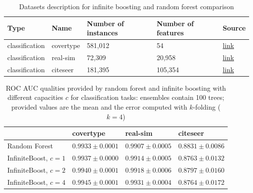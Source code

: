 \begin{table}[!t]
  \caption{Datasets description for infinite boosting and random forest comparison}
  \label{tab:rf-data}
  \centering
  \dospace
  \begin{tabular}{lllll}
    \toprule
    Type     &  Name & Number of instances     & Number of features & Source \\
    \midrule
    classification & covertype & 581,012  & 54  & \href{https://archive.ics.uci.edu/ml/datasets/covertype}{\underline{link}}   \\
    classification     & real-sim  & 72,309 & 20,958  & \href{https://www.csie.ntu.edu.tw/~cjlin/libsvmtools/datasets/binary.html}{\underline{link}}     \\
    classification     & citeseer &  181,395 & 105,354 & \href{http://komarix.org/ac/ds/}{\underline{link}}\\
    \bottomrule
  \end{tabular}
\end{table}

\begin{table}[!t]
    \caption{
    ROC AUC qualities provided by random forest and infinite boosting with different capacities $c$ for classification tasks: ensembles contain 100 trees;
    provided values are the mean and the error computed with $k$-folding ($k=4$)
    }
    \label{tab:rf-auc}
    \centering
    \dospace
    \begin{tabular}{llll}
    \toprule
    {} &               covertype &               real-sim &              citeseer \\
    \midrule
    Random Forest      &  $ 0.9933 \pm 0.0001 $ &  $ 0.9907 \pm 0.0005 $ &  $ 0.8831 \pm 0.0086 $ \\
    InfiniteBoost, $c=1$ &  $ 0.9937 \pm 0.0000 $ &  $ 0.9914 \pm 0.0005 $ &  $ 0.8763 \pm 0.0132 $ \\
    InfiniteBoost, $c=2$ &  $ 0.9940 \pm 0.0001 $ &  $ 0.9918 \pm 0.0006 $ &  $ 0.8797 \pm 0.0160 $ \\
    InfiniteBoost, $c=4$ &  $ 0.9945 \pm 0.0001 $ &  $ 0.9931 \pm 0.0004 $ &  $ 0.8764 \pm 0.0172 $ \\
    \bottomrule
    \end{tabular}

\end{table}

